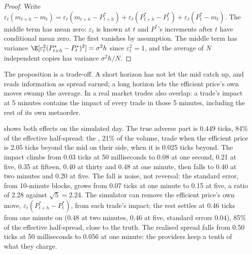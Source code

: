 \begin{proof}
Write $\varepsilon_t(m_{t+h}-m_t)=\varepsilon_t(m_{t+h}-P^\ast_{t+h})+\varepsilon_t(P^\ast_{t+h}-P^\ast_t)+\varepsilon_t(P^\ast_t-m_t)$. The middle term has mean
zero: $\varepsilon_t$ is known at $t$ and $P^\ast$'s increments after $t$ have conditional mean zero. The first vanishes by assumption. The middle term
has variance $\E[\varepsilon_t^2(P^\ast_{t+h}-P^\ast_t)^2]=\sigma^2h$ since $\varepsilon_t^2=1$, and the average of $N$ independent copies has variance
$\sigma^2h/N$.
\end{proof}

The proposition is a trade-off. A short horizon has not let the mid catch up, and reads information as spread earned; a long horizon lets the efficient
price's own moves swamp the average. In a real market trades also overlap: a trade's impact at 5 minutes contains the impact of every trade in those
5 minutes, including the rest of its own metaorder.

 shows both effects on the simulated day. The true adverse part is 0.449 ticks, 84\% of the effective
half-spread: the , 21\% of the volume, trade when the efficient price is 2.05 ticks beyond the mid on their side,  when it
is 0.025 ticks beyond. The impact climbs from 0.03 ticks at 50 milliseconds to 0.08 at one second, 0.21 at five, 0.35 at fifteen, 0.40 at thirty and 0.48
at one minute, then falls to 0.40 at two minutes and 0.20 at five. The fall is noise, not reversal: the standard error, from 10-minute blocks, grows from
0.07 ticks at one minute to 0.15 at five, a ratio of 2.28 against $\sqrt5=2.24$. The simulator can remove the efficient price's own move,
$\varepsilon_t(P^\ast_{t+h}-P^\ast_t)$, from each trade's impact; the rest settles at 0.46 ticks from one minute on (0.48 at two minutes, 0.46 at five,
standard errors 0.04), 85\% of the effective half-spread, close to the truth. The realised spread falls from 0.50 ticks at 50 milliseconds to 0.056 at
one minute: the providers keep a tenth of what they charge.

